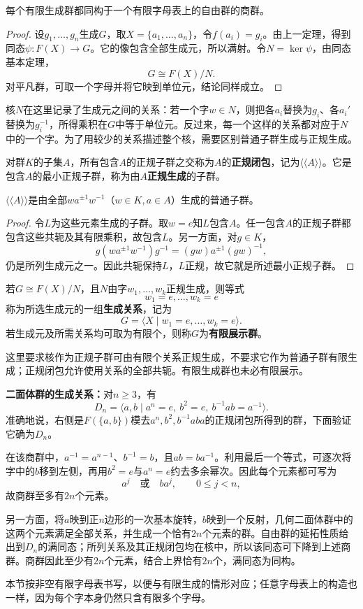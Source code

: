 \begin{corollary}
每个有限生成群都同构于一个有限字母表上的自由群的商群。
\end{corollary}
\begin{proof}
设$g_1,\ldots,g_n$生成$G$，取$X=\{a_1,\ldots,a_n\}$，令$f(a_i)=g_i$。由上一定理，得到同态$\psi:F(X)\to G$。它的像包含全部生成元，所以满射。令$N=\ker\psi$，由同态基本定理，
\[
G\cong F(X)/N.
\]
对平凡群，可取一个字母并将它映到单位元，结论同样成立。
\end{proof}

核$N$在这里记录了生成元之间的关系：若一个字$w\in N$，则把各$a_i$替换为$g_i$、各$a_i'$替换为$g_i^{-1}$，所得乘积在$G$中等于单位元。反过来，每一个这样的关系都对应于$N$中的一个字。为了用较少的关系描述整个核，需要区别普通子群生成与正规生成。

\begin{definition}
对群$K$的子集$A$，所有包含$A$的正规子群之交称为$A$的\textbf{正规闭包}，记为$\langle\!\langle A\rangle\!\rangle$。它是包含$A$的最小正规子群，称为由$A$\textbf{正规生成}的子群。
\end{definition}
\begin{proposition}
$\langle\!\langle A\rangle\!\rangle$是由全部$wa^{\pm1}w^{-1}$（$w\in K,a\in A$）生成的普通子群。
\end{proposition}
\begin{proof}
令$L$为这些元素生成的子群。取$w=e$知$L$包含$A$。任一包含$A$的正规子群都包含这些共轭及其有限乘积，故包含$L$。另一方面，对$g\in K$，
\[
g(wa^{\pm1}w^{-1})g^{-1}=(gw)a^{\pm1}(gw)^{-1},
\]
仍是所列生成元之一。因此共轭保持$L$，$L$正规，故它就是所述最小正规子群。
\end{proof}

\begin{definition}
若$G\cong F(X)/N$，且$N$由字$w_1,\ldots,w_k$正规生成，则等式
\[
w_1=e,\ldots,w_k=e
\]
称为所选生成元的一组\textbf{生成关系}，记为
\[
G=\langle X\mid w_1=e,\ldots,w_k=e\rangle.
\]
若生成元及所需关系均可取为有限个，则称$G$为\textbf{有限展示群}。
\end{definition}

这里要求核作为正规子群可由有限个关系正规生成，不要求它作为普通子群有限生成；正规闭包允许使用关系的全部共轭。有限生成群也未必有限展示。

\begin{example}
\textbf{二面体群的生成关系：}对$n\geq3$，有
\[
D_n=\langle a,b\mid a^n=e,\ b^2=e,\ b^{-1}ab=a^{-1}\rangle.
\]
准确地说，右侧是$F(\{a,b\})$模去$a^n,b^2,b^{-1}aba$的正规闭包所得到的群，下面验证它确为$D_n$。

在该商群中，$a^{-1}=a^{n-1}$、$b^{-1}=b$，且$ab=ba^{-1}$。利用最后一个等式，可逐次将字中的$b$移到左侧，再用$b^2=e$与$a^n=e$约去多余幂次。因此每个元素都可写为
\[
a^j\quad\text{或}\quad ba^j,\qquad0\leq j<n,
\]
故商群至多有$2n$个元素。

另一方面，将$a$映到正$n$边形的一次基本旋转，$b$映到一个反射，几何二面体群中的这两个元素满足全部关系，并生成一个恰有$2n$个元素的群。自由群的延拓性质给出到$D_n$的满同态；所列关系及其正规闭包均在核中，所以该同态可下降到上述商群。商群因此至少有$2n$个元素，结合上界恰有$2n$个，满同态为同构。
\end{example}

本节按非空有限字母表书写，以便与有限生成的情形对应；任意字母表上的构造也一样，因为每个字本身仍然只含有限多个字母。

%
